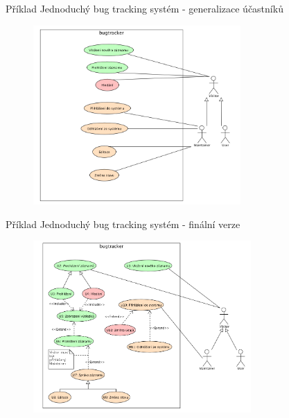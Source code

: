 
\begin{frame}{Příklad}
Jednoduchý bug tracking systém - generalizace účastníků
\begin{figure}
	\includegraphics[width=79mm]{img/diagramy/UseCase/bugtracker2.png}
\end{figure}

\end{frame}


\begin{frame}{Příklad}
Jednoduchý bug tracking systém - finální verze
\begin{figure}
	\includegraphics[width=83mm]{img/diagramy/UseCase/bugtracker3.png}
\end{figure}

\end{frame}

